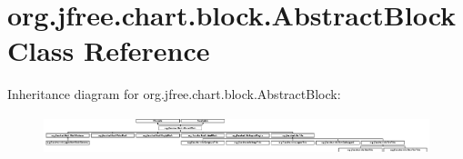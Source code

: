 \hypertarget{classorg_1_1jfree_1_1chart_1_1block_1_1_abstract_block}{}\section{org.\+jfree.\+chart.\+block.\+Abstract\+Block Class Reference}
\label{classorg_1_1jfree_1_1chart_1_1block_1_1_abstract_block}
Inheritance diagram for org.\+jfree.\+chart.\+block.\+Abstract\+Block\+:\begin{figure}[H]
\begin{center}
\leavevmode
\includegraphics[height=1.115093cm]{classorg_1_1jfree_1_1chart_1_1block_1_1_abstract_block}
\end{center}
\end{figure}
